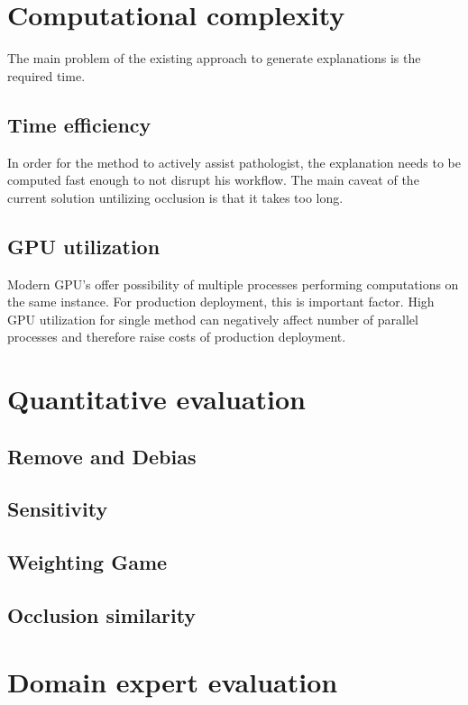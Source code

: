
\section{Computational complexity}

The main problem of the existing approach to generate explanations is the required time.

\subsection*{Time efficiency}

In order for the method to actively assist pathologist, the explanation needs to be computed fast enough to not disrupt his workflow. The main caveat of the current solution untilizing occlusion is that it takes too long.

\subsection*{GPU utilization}

Modern GPU's offer possibility of multiple processes performing computations on the same instance. For production deployment, this is important factor. High GPU utilization for single method can negatively affect number of parallel processes and therefore raise costs of production deployment.

\section{Quantitative evaluation}

\subsection*{Remove and Debias}

\subsection*{Sensitivity}

\subsection*{Weighting Game}

\subsection*{Occlusion similarity}

\section{Domain expert evaluation}
